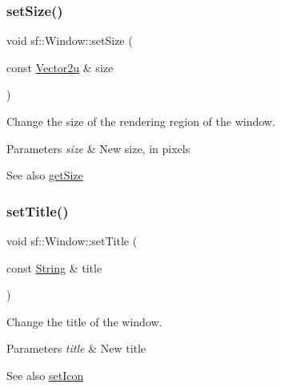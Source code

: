 \subsubsection{\texorpdfstring{set\+Size()}{setSize()}}
{\footnotesize\ttfamily void sf\+::\+Window\+::set\+Size (\begin{DoxyParamCaption}\item[{const \hyperlink{classsf_1_1_vector2}{Vector2u} \&}]{size }\end{DoxyParamCaption})}



Change the size of the rendering region of the window. 


\begin{DoxyParams}{Parameters}
{\em size} & New size, in pixels\\
\hline
\end{DoxyParams}
\begin{DoxySeeAlso}{See also}
\hyperlink{classsf_1_1_window_a3969926741cbe83d7f9eeaf5333d4e71}{get\+Size} 
\end{DoxySeeAlso}
\mbox{\label{classsf_1_1_window_a3b3f3513bb6be90f5cd456c20b5fd5fa}} 
\subsubsection{\texorpdfstring{set\+Title()}{setTitle()}}
{\footnotesize\ttfamily void sf\+::\+Window\+::set\+Title (\begin{DoxyParamCaption}\item[{const \hyperlink{classsf_1_1_string}{String} \&}]{title }\end{DoxyParamCaption})}



Change the title of the window. 


\begin{DoxyParams}{Parameters}
{\em title} & New title\\
\hline
\end{DoxyParams}
\begin{DoxySeeAlso}{See also}
\hyperlink{classsf_1_1_window_a63af61e026fba08e3153fd013620bcc0}{set\+Icon} 
\end{DoxySeeAlso}
\mbox{\label{classsf_1_1_window_a59041c4556e0351048f8aff366034f61}} 
